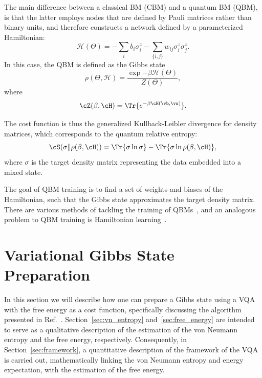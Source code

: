 The main difference between a classical BM (CBM)  and a quantum BM (QBM), is that the latter employs nodes that are defined by Pauli matrices rather than binary units, and therefore constructs a network defined by a parameterized Hamiltonian:
\begin{equation}
    \mathcal{H}(\Theta) = -\sum_{i} b_i \sigma^z_i - \sum_{\{i, j\}} w_{ij} \sigma^z_i \sigma^z_j.
\end{equation}
In this case, the \ac{QBM} is defined as the Gibbs state
\begin{equation}
    \rho(\Theta, \mathcal{H}) = \frac{\exp{-\beta \mathcal{H}(\Theta)}}{Z(\Theta)},
\end{equation}
where
\begin{equation}
    \cZ(\beta, \cH) = \Tr{e^{-\beta \cH(\vb, \vw)}}.
\end{equation}

The cost function is thus the generalized Kullback-Leibler divergence for density matrices, which corresponds to the quantum relative entropy:
\begin{equation}
    \cS(\sigma \| \rho(\beta, \cH)) = \Tr{\sigma \ln \sigma} - \Tr{\sigma \ln \rho(\beta, \cH)},
\end{equation}
where $\sigma$ is the target density matrix representing the data embedded into a mixed state.

The goal of \ac{QBM} training is to find a set of weights and biases
of the Hamiltonian, such that the Gibbs state approximates the target
density matrix. There are various methods of tackling the training of
\acp{QBM}~\cite{Gacon2022, Zoufal2021, Coopmans2023, Kalis2023,
  Huijgen2023}, and an analogous problem to \ac{QBM} training is
Hamiltonian learning~\cite{Anshu2021}.

\section{Variational Gibbs State Preparation} \label{sec:VGSP}

In this section we will describe how one can prepare a Gibbs state
using a \ac{VQA} with the free energy as a cost function, specifically
discussing the algorithm presented in
Ref.~\cite{Consiglio2023}. Section~\ref{sec:vn_entropy}
and~\ref{sec:free_energy} are intended to serve as a qualitative
description of the estimation of the von Neumann entropy and the free
energy, respectively. Consequently, in Section~\ref{sec:framework}, a
quantitative description of the framework of the \ac{VQA} is carried
out, mathematically linking the von Neumann entropy and energy
expectation, with the estimation of the free energy.

